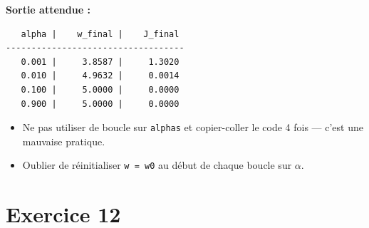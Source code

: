 \textbf{Sortie attendue :}
\begin{verbatim}
   alpha |    w_final |    J_final
-----------------------------------
   0.001 |     3.8587 |     1.3020
   0.010 |     4.9632 |     0.0014
   0.100 |     5.0000 |     0.0000
   0.900 |     5.0000 |     0.0000
\end{verbatim}

\begin{attentionbox}
    \begin{itemize}
        \item Ne pas utiliser de boucle sur \texttt{alphas} et copier-coller le code 4 fois --- c'est une mauvaise pratique.
        \item Oublier de r\'{e}initialiser \texttt{w = w0} au d\'{e}but de chaque boucle sur $\alpha$.
    \end{itemize}
\end{attentionbox}

\section*{Exercice 12 \hfill \exoavance}

\separateur

